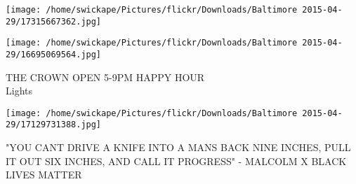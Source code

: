 \documentclass[10pt,letterpaper]{article}
\begin{document}
\texttt{[image: /home/swickape/Pictures/flickr/Downloads/Baltimore 2015-04-29/17315667362.jpg]}

\vspace{0.25in}
\texttt{[image: /home/swickape/Pictures/flickr/Downloads/Baltimore 2015-04-29/16695069564.jpg]}

THE CROWN OPEN 5{-}9PM HAPPY HOUR\\
Lights
\pagebreak

\texttt{[image: /home/swickape/Pictures/flickr/Downloads/Baltimore 2015-04-29/17129731388.jpg]}

"YOU CANT DRIVE A KNIFE INTO A MANS BACK NINE INCHES, PULL IT OUT SIX INCHES, AND CALL IT PROGRESS" {-} MALCOLM X BLACK LIVES MATTER
\pagebreak
\end{document}
